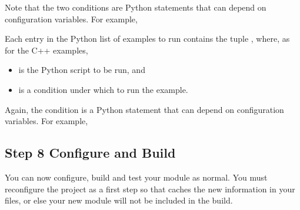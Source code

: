 \documentclass[letterpaper,10pt,english]{sphinxmanual}
\renewcommand{\sphinxcode}[1]{\texttt{\small{#1}}}
\begin{document}
Note that the two conditions are Python statements that
can depend on \sphinxcode{} configuration variables.  For example,

\begin{sphinxVerbatim}[commandchars=\\\{\}]
  
\end{sphinxVerbatim}

Each entry in the Python list of examples to run contains the tuple
\sphinxcode{}, where, as for the C++ examples,
\begin{itemize}
\item {} 
\sphinxcode{} is the Python script to be run, and

\item {} 
\sphinxcode{} is a condition under which to run the example.

\end{itemize}

Again, the condition is a Python statement that can
depend on \sphinxcode{} configuration variables.  For example,

\begin{sphinxVerbatim}[commandchars=\\\{\}]
 
\end{sphinxVerbatim}


\subsection{Step 8 \sphinxhyphen{} Configure and Build}
\label{\detokenize{new-modules:step-8-configure-and-build}}
You can now configure, build and test your module as normal.
You must reconfigure the project as a first step so that \sphinxcode{}
caches the new information in your \sphinxcode{} files,
or else your new module will not be included in the build.
\end{document}
